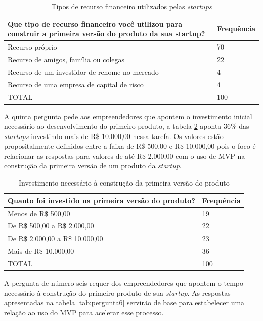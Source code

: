 \begin{table}[hb]
\centering
\caption{Tipos de recurso financeiro utilizados pelas \emph{startups}}
\label{tab:pergunta4}
\begin{tabular}{|p{10cm}|p{2cm}|}
\hline{\bf Que tipo de recurso financeiro voc\^e utilizou para construir a primeira vers\~ao do produto da sua startup?} & {\bf Frequ\^encia}\\
\hline Recurso pr\'oprio & 70\\
\hline Recurso de amigos, fam\'ilia ou colegas & 22\\
\hline Recurso de um investidor de renome no mercado & 4\\
\hline Recurso de uma empresa de capital de risco & 4\\
\hline TOTAL & 100\\
\hline
\end{tabular}
\end{table}

A quinta pergunta pede aos empreendedores que apontem o investimento inicial necess\'ario ao desenvolvimento do primeiro produto, a tabela \ref{tab:pergunta5} aponta 36\% das \emph{startups} investindo mais de R\$ 10.000,00 nessa tarefa. Os valores est\~ao propositalmente definidos entre a faixa de R\$ 500,00 e R\$ 10.000,00 pois o foco \'e relacionar as respostas para valores de at\'e R\$ 2.000,00 com o uso de MVP na constru\c{c}\~ao da primeira vers\~ao de um produto da \emph{startup}.

\begin{table}[hb]
\centering
\caption{Investimento necess\'ario \`a constru\c{c}\~ao da primeira vers\~ao do produto}
\label{tab:pergunta5}
\begin{tabular}{|p{10cm}|p{2cm}|}
\hline{\bf Quanto foi investido na primeira vers\~ao do produto?} & {\bf Frequ\^encia}\\
\hline Menos de R\$ 500,00 & 19\\
\hline De R\$ 500,00 a R\$ 2.000,00 & 22\\
\hline De R\$ 2.000,00 a R\$ 10.000,00 & 23\\
\hline Mais de R\$ 10.000,00 & 36\\
\hline TOTAL & 100\\
\hline
\end{tabular}
\end{table}

\pagebreak

A pergunta de n\'umero seis requer dos empreendedores que apontem o tempo necess\'ario \`a constru\c{c}\~ao do primeiro produto de sua \emph{startup}. As respostas apresentadas na tabela \ref{tab:pergunta6} servir\~ao de base para estabelecer uma rela\c{c}\~ao ao uso do MVP para acelerar esse processo.

